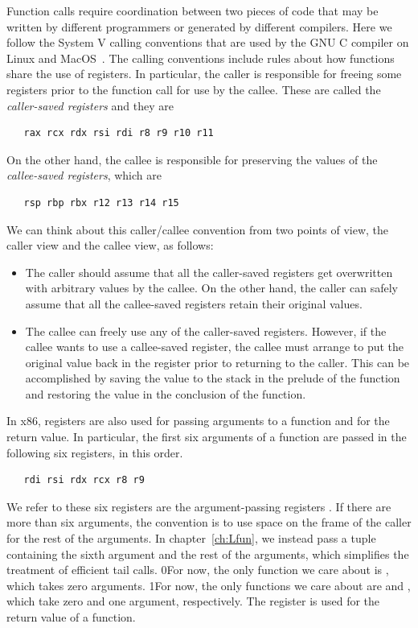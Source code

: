 \documentclass[7x10]{TimesAPriori_MIT}%
\def\racketEd{0}
\def\pythonEd{1}
\def\edition{1}
\newcommand{\racket}[1]{{\if\edition\racketEd{#1}\fi}}
\newcommand{\pythonColor}[0]{}
\newcommand{\python}[1]{{\if\edition\pythonEd\pythonColor #1\fi}}
\numberwithin{theorem}{chapter}
\numberwithin{definition}{chapter}
\numberwithin{equation}{chapter}
\begin{document}
Function calls require coordination between two pieces of code that
may be written by different programmers or generated by different
compilers. Here we follow the System V calling conventions that are
used by the GNU C compiler on Linux and
MacOS~\citep{Bryant:2005aa,Matz:2013aa}.
%
The calling conventions include rules about how functions share the
use of registers. In particular, the caller is responsible for freeing
some registers prior to the function call for use by the callee.
These are called the \emph{caller-saved registers}
and they are
\begin{lstlisting}
   rax rcx rdx rsi rdi r8 r9 r10 r11
\end{lstlisting}
On the other hand, the callee is responsible for preserving the values
of the \emph{callee-saved registers}, 
which are
\begin{lstlisting}
   rsp rbp rbx r12 r13 r14 r15
\end{lstlisting}

We can think about this caller/callee convention from two points of
view, the caller view and the callee view, as follows:
\begin{itemize}
\item The caller should assume that all the caller-saved registers get
  overwritten with arbitrary values by the callee.  On the other hand,
  the caller can safely assume that all the callee-saved registers
  retain their original values.
\item The callee can freely use any of the caller-saved registers.
  However, if the callee wants to use a callee-saved register, the
  callee must arrange to put the original value back in the register
  prior to returning to the caller. This can be accomplished by saving
  the value to the stack in the prelude of the function and restoring
  the value in the conclusion of the function.
\end{itemize}

In x86, registers are also used for passing arguments to a function
and for the return value.  In particular, the first six arguments of a
function are passed in the following six registers, in this order.
\begin{lstlisting}
   rdi rsi rdx rcx r8 r9
\end{lstlisting}
We refer to these six registers are the argument-passing registers
.
If there are more than six arguments, the convention is to use space
on the frame of the caller for the rest of the arguments. In
chapter~\ref{ch:Lfun}, we instead pass a tuple containing the sixth
argument and the rest of the arguments, which simplifies the treatment
of efficient tail calls.
%
\racket{For now, the only function we care about is ,
  which takes zero arguments.}
%
\python{For now, the only functions we care about are \code{read\_int}
  and \code{print\_int}, which take zero and one argument, respectively.}
%
The register  is used for the return value of a function.
\end{document}
